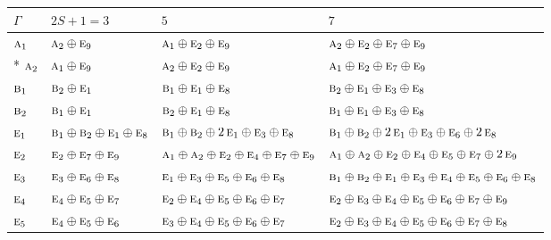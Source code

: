 \documentclass[10pt,a4paper]{article}
\numberwithin{equation}{section}
\newcommand{\irr}[1]{\text{\normalfont\scshape #1}}
\begin{document}
{\small\setlength{\tabcolsep}{3pt}\begin{longtable}{@{}llll@{}}\toprule
$\Gamma$ & $2S + 1 = 3$ & $5$ & $7$\\\midrule\endhead
\bottomrule\endfoot\endlastfoot
$\irr{a}_{1}$ & $\irr{a}_{2}\oplus \irr{e}_{9}$ & $\irr{a}_{1}\oplus \irr{e}_{2}\oplus \irr{e}_{9}$ & $\irr{a}_{2}\oplus \irr{e}_{2}\oplus \irr{e}_{7}\oplus \irr{e}_{9}$\\*
$\irr{a}_{2}$ & $\irr{a}_{1}\oplus \irr{e}_{9}$ & $\irr{a}_{2}\oplus \irr{e}_{2}\oplus \irr{e}_{9}$ & $\irr{a}_{1}\oplus \irr{e}_{2}\oplus \irr{e}_{7}\oplus \irr{e}_{9}$\\
$\irr{b}_{1}$ & $\irr{b}_{2}\oplus \irr{e}_{1}$ & $\irr{b}_{1}\oplus \irr{e}_{1}\oplus \irr{e}_{8}$ & $\irr{b}_{2}\oplus \irr{e}_{1}\oplus \irr{e}_{3}\oplus \irr{e}_{8}$\\
$\irr{b}_{2}$ & $\irr{b}_{1}\oplus \irr{e}_{1}$ & $\irr{b}_{2}\oplus \irr{e}_{1}\oplus \irr{e}_{8}$ & $\irr{b}_{1}\oplus \irr{e}_{1}\oplus \irr{e}_{3}\oplus \irr{e}_{8}$\\
$\irr{e}_{1}$ & $\irr{b}_{1}\oplus \irr{b}_{2}\oplus \irr{e}_{1}\oplus \irr{e}_{8}$ & $\irr{b}_{1}\oplus \irr{b}_{2}\oplus 2\,\irr{e}_{1}\oplus \irr{e}_{3}\oplus \irr{e}_{8}$ & $\irr{b}_{1}\oplus \irr{b}_{2}\oplus 2\,\irr{e}_{1}\oplus \irr{e}_{3}\oplus \irr{e}_{6}\oplus 2\,\irr{e}_{8}$\\
$\irr{e}_{2}$ & $\irr{e}_{2}\oplus \irr{e}_{7}\oplus \irr{e}_{9}$ & $\irr{a}_{1}\oplus \irr{a}_{2}\oplus \irr{e}_{2}\oplus \irr{e}_{4}\oplus \irr{e}_{7}\oplus \irr{e}_{9}$ & $\irr{a}_{1}\oplus \irr{a}_{2}\oplus \irr{e}_{2}\oplus \irr{e}_{4}\oplus \irr{e}_{5}\oplus \irr{e}_{7}\oplus 2\,\irr{e}_{9}$\\
$\irr{e}_{3}$ & $\irr{e}_{3}\oplus \irr{e}_{6}\oplus \irr{e}_{8}$ & $\irr{e}_{1}\oplus \irr{e}_{3}\oplus \irr{e}_{5}\oplus \irr{e}_{6}\oplus \irr{e}_{8}$ & $\irr{b}_{1}\oplus \irr{b}_{2}\oplus \irr{e}_{1}\oplus \irr{e}_{3}\oplus \irr{e}_{4}\oplus \irr{e}_{5}\oplus \irr{e}_{6}\oplus \irr{e}_{8}$\\
$\irr{e}_{4}$ & $\irr{e}_{4}\oplus \irr{e}_{5}\oplus \irr{e}_{7}$ & $\irr{e}_{2}\oplus \irr{e}_{4}\oplus \irr{e}_{5}\oplus \irr{e}_{6}\oplus \irr{e}_{7}$ & $\irr{e}_{2}\oplus \irr{e}_{3}\oplus \irr{e}_{4}\oplus \irr{e}_{5}\oplus \irr{e}_{6}\oplus \irr{e}_{7}\oplus \irr{e}_{9}$\\
$\irr{e}_{5}$ & $\irr{e}_{4}\oplus \irr{e}_{5}\oplus \irr{e}_{6}$ & $\irr{e}_{3}\oplus \irr{e}_{4}\oplus \irr{e}_{5}\oplus \irr{e}_{6}\oplus \irr{e}_{7}$ & $\irr{e}_{2}\oplus \irr{e}_{3}\oplus \irr{e}_{4}\oplus \irr{e}_{5}\oplus \irr{e}_{6}\oplus \irr{e}_{7}\oplus \irr{e}_{8}$\\

\end{longtable}}
\end{document}
